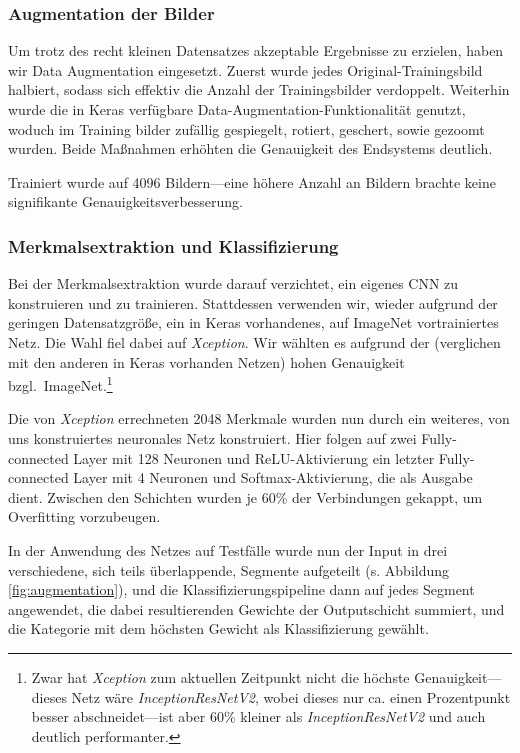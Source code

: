 \documentclass[a4,german]{article}
\begin{document}
\subsubsection{Augmentation der Bilder}
\label{sec:augmentation}

Um trotz des recht kleinen Datensatzes akzeptable Ergebnisse zu erzielen, haben wir Data Augmentation eingesetzt.
Zuerst wurde jedes Original-Trainingsbild halbiert, sodass sich effektiv die Anzahl der Trainingsbilder verdoppelt.
Weiterhin wurde die in Keras verfügbare Data-Augmentation-Funktionalität genutzt, woduch im Training bilder zufällig gespiegelt, rotiert, geschert, sowie gezoomt wurden.
Beide Maßnahmen erhöhten die Genauigkeit des Endsystems deutlich.

Trainiert wurde auf 4096 Bildern---eine höhere Anzahl an Bildern brachte keine signifikante Genauigkeitsverbesserung.


\subsubsection{Merkmalsextraktion und Klassifizierung}
\label{sec:neural}

Bei der Merkmalsextraktion wurde darauf verzichtet, ein eigenes CNN zu konstruieren und zu trainieren.
Stattdessen verwenden wir, wieder aufgrund der geringen Datensatzgröße, ein in Keras vorhandenes, auf ImageNet vortrainiertes Netz.
Die Wahl fiel dabei auf \emph{Xception}. %
Wir wählten es aufgrund der (verglichen mit den anderen in Keras vorhanden Netzen) hohen Genauigkeit bzgl.\ ImageNet.\footnote{Zwar hat \emph{Xception} zum aktuellen Zeitpunkt nicht die höchste Genauigkeit---dieses Netz wäre \emph{InceptionResNetV2}, wobei dieses nur ca. einen Prozentpunkt besser abschneidet---ist aber 60\% kleiner als \emph{InceptionResNetV2} und auch deutlich performanter.}

Die von \emph{Xception} errechneten 2048 Merkmale wurden nun durch ein weiteres, von uns konstruiertes neuronales Netz konstruiert.
Hier folgen auf zwei Fully-connected Layer mit 128 Neuronen und ReLU-Aktivierung ein letzter Fully-connected Layer mit 4 Neuronen und Softmax-Aktivierung, die als Ausgabe dient.
Zwischen den Schichten wurden je 60\% der Verbindungen gekappt, um Overfitting vorzubeugen.


In der Anwendung des Netzes auf Testfälle wurde nun der Input in drei verschiedene, sich teils überlappende, Segmente aufgeteilt (s. Abbildung \ref{fig:augmentation}), und die Klassifizierungspipeline dann auf jedes Segment angewendet, die dabei resultierenden Gewichte der Outputschicht summiert, und die Kategorie mit dem höchsten Gewicht als Klassifizierung gewählt.
\end{document}
